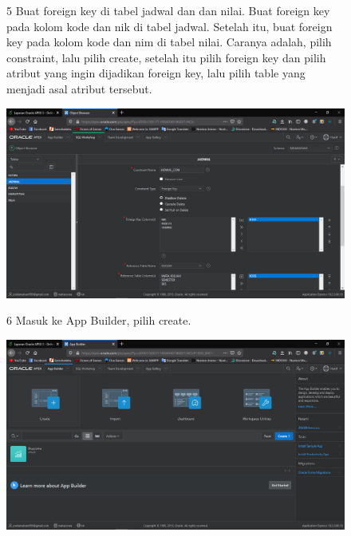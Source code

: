 \begin{enumerate}
\begin{figure}[!htbp]    
\item[5] Buat foreign key di tabel jadwal dan dan nilai. Buat foreign key pada kolom kode dan nik di tabel jadwal. Setelah itu, buat foreign key pada kolom kode dan nim di tabel nilai. Caranya adalah, pilih constraint, lalu pilih create, setelah itu pilih foreign key dan pilih atribut yang ingin dijadikan foreign key, lalu pilih table yang menjadi asal atribut tersebut.  \begin{center}
    \includegraphics[scale=0.3]{figures/Screenshot(47).png}
    \end{center}
    \end{figure}
    
\begin{figure}[!htbp]
\item[6] Masuk ke App Builder, pilih create.
\begin{center}
    \includegraphics[scale=0.3]{figures/Screenshot(50).png}
    \end{center}
    \end{figure}
    

\end{enumerate}
